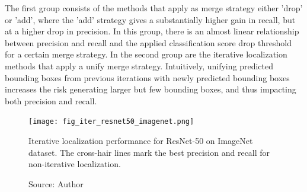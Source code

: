The first group consists of the methods that apply as merge strategy either 'drop' or 'add', where the 'add' strategy gives a substantially higher gain in recall, but at a higher drop in precision. In this group, there is an almost linear relationship between precision and recall and the applied classification score drop threshold for a certain merge strategy. In the second group are the iterative localization methods that apply a unify merge strategy. Intuitively, unifying predicted bounding boxes from previous iterations with newly predicted bounding boxes increases the risk generating larger but few bounding boxes, and thus impacting both precision and recall.

\begin{figure}[ht]
    \begin{center}       
    \texttt{[image: fig\_iter\_resnet50\_imagenet.png]}
    \caption[Iterative localization performance for ResNet-50 on ImageNet dataset]{Iterative localization performance for ResNet-50 on ImageNet dataset. The cross-hair lines mark the best precision and recall for non-iterative localization.}
    \caption*{Source: Author}
    \label{fig:prec_iter_resnet50_imagenet}
    \end{center}
\end{figure}

